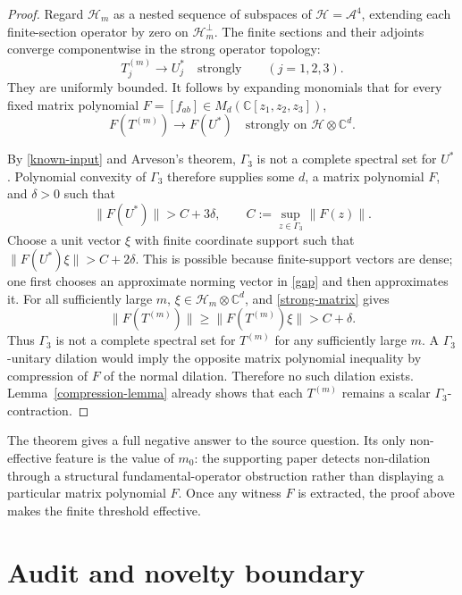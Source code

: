\documentclass[11pt]{article}
\newcommand{\G}{\Gamma_3}
\newcommand{\cH}{\mathcal H}
\newcommand{\cA}{\mathcal A}
\begin{document}
\begin{proof}
Regard $\cH_m$ as a nested sequence of subspaces of $\cH=\cA^4$, extending
each finite-section operator by zero on $\cH_m^\perp$.  The finite sections
and their adjoints converge componentwise in the strong operator topology:
\[
 T_j^{(m)}\longrightarrow U_j^*\quad\text{strongly}
 \qquad(j=1,2,3).
\]
They are uniformly bounded.  It follows by expanding monomials that for
every fixed matrix polynomial $F=[f_{ab}]\in M_d(\mathbb C[z_1,z_2,z_3])$,
\begin{equation}\label{strong-matrix}
 F(T^{(m)})\longrightarrow F(U^*)\quad\text{strongly on }\cH\otimes\mathbb C^d.
\end{equation}

By \eqref{known-input} and Arveson's theorem, $\G$ is not a complete
spectral set for $U^*$.  Polynomial convexity of $\G$ therefore supplies
some $d$, a matrix polynomial $F$, and $\delta>0$ such that
\begin{equation}\label{gap}
 \|F(U^*)\|>
 C+3\delta,
 \qquad
 C:=\sup_{z\in\G}\|F(z)\|.
\end{equation}
Choose a unit vector $\xi$ with finite coordinate support such that
$\|F(U^*)\xi\|>C+2\delta$.  This is possible because finite-support
vectors are dense; one first chooses an approximate norming vector in
\eqref{gap} and then approximates it.  For all sufficiently large $m$,
$\xi\in\cH_m\otimes\mathbb C^d$, and \eqref{strong-matrix} gives
\[
 \|F(T^{(m)})\|
 \geq\|F(T^{(m)})\xi\|>C+\delta.
\]
Thus $\G$ is not a complete spectral set for $T^{(m)}$ for any sufficiently
large $m$.  A $\G$-unitary dilation would imply the opposite matrix
polynomial inequality by compression of $F$ of the normal dilation.
Therefore no such dilation exists.  Lemma~\ref{compression-lemma} already
shows that each $T^{(m)}$ remains a scalar $\G$-contraction.
\end{proof}

The theorem gives a full negative answer to the source question.  Its only
non-effective feature is the value of $m_0$: the supporting paper detects
non-dilation through a structural fundamental-operator obstruction rather
than displaying a particular matrix polynomial $F$.  Once any witness $F$
is extracted, the proof above makes the finite threshold effective.

\section{Audit and novelty boundary}
\end{document}
